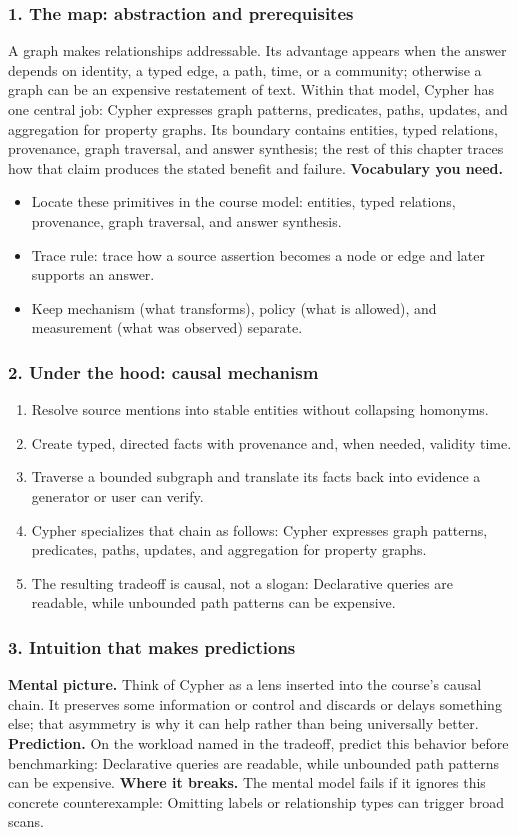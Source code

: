 \subsubsection*{1. The map: abstraction and prerequisites}
A graph makes relationships addressable. Its advantage appears when the answer depends on identity, a typed edge, a path, time, or a community; otherwise a graph can be an expensive restatement of text.
Within that model, Cypher has one central job: Cypher expresses graph patterns, predicates, paths, updates, and aggregation for property graphs. Its boundary contains entities, typed relations, provenance, graph traversal, and answer synthesis; the rest of this chapter traces how that claim produces the stated benefit and failure.
\textbf{Vocabulary you need.}\begin{itemize}
\item Locate these primitives in the course model: entities, typed relations, provenance, graph traversal, and answer synthesis.
\item Trace rule: trace how a source assertion becomes a node or edge and later supports an answer.
\item Keep mechanism (what transforms), policy (what is allowed), and measurement (what was observed) separate.
\end{itemize}
\subsubsection*{2. Under the hood: causal mechanism}\begin{enumerate}
\item Resolve source mentions into stable entities without collapsing homonyms.
\item Create typed, directed facts with provenance and, when needed, validity time.
\item Traverse a bounded subgraph and translate its facts back into evidence a generator or user can verify.
\item Cypher specializes that chain as follows: Cypher expresses graph patterns, predicates, paths, updates, and aggregation for property graphs.
\item The resulting tradeoff is causal, not a slogan: Declarative queries are readable, while unbounded path patterns can be expensive.
\end{enumerate}
\subsubsection*{3. Intuition that makes predictions}
\textbf{Mental picture.} Think of Cypher as a lens inserted into the course's causal chain. It preserves some information or control and discards or delays something else; that asymmetry is why it can help rather than being universally better.
\textbf{Prediction.} On the workload named in the tradeoff, predict this behavior before benchmarking: Declarative queries are readable, while unbounded path patterns can be expensive.
\textbf{Where it breaks.} The mental model fails if it ignores this concrete counterexample: Omitting labels or relationship types can trigger broad scans.
